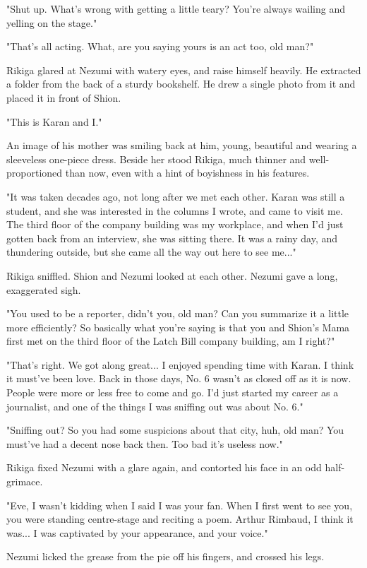 "Shut up. What's wrong with getting a little teary? You're always
wailing and yelling on the stage."

"That's all acting. What, are you saying yours is an act too, old man?"

Rikiga glared at Nezumi with watery eyes, and raise himself heavily. He
extracted a folder from the back of a sturdy bookshelf. He drew a single
photo from it and placed it in front of Shion.

"This is Karan and I."

An image of his mother was smiling back at him, young, beautiful and
wearing a sleeveless one-piece dress. Beside her stood Rikiga, much
thinner and well-proportioned than now, even with a hint of boyishness
in his features.

"It was taken decades ago, not long after we met each other. Karan was
still a student, and she was interested in the columns I wrote, and came
to visit me. The third floor of the company building was my workplace,
and when I'd just gotten back from an interview, she was sitting there.
It was a rainy day, and thundering outside, but she came all the way out
here to see me..."

Rikiga sniffled. Shion and Nezumi looked at each other. Nezumi gave a
long, exaggerated sigh.

"You used to be a reporter, didn't you, old man? Can you summarize it a
little more efficiently? So basically what you're saying is that you and
Shion's Mama first met on the third floor of the Latch Bill company
building, am I right?"

"That's right. We got along great... I enjoyed spending time with Karan.
I think it must've been love. Back in those days, No. 6 wasn't as closed
off as it is now. People were more or less free to come and go. I'd just
started my career as a journalist, and one of the things I was sniffing
out was about No. 6."

"Sniffing out? So you had some suspicions about that city, huh, old man?
You must've had a decent nose back then. Too bad it's useless now."

Rikiga fixed Nezumi with a glare again, and contorted his face in an odd
half-grimace.

"Eve, I wasn't kidding when I said I was your fan. When I first went to
see you, you were standing centre-stage and reciting a poem. Arthur
Rimbaud, I think it was... I was captivated by your appearance, and your
voice."

Nezumi licked the grease from the pie off his fingers, and crossed his
legs.

